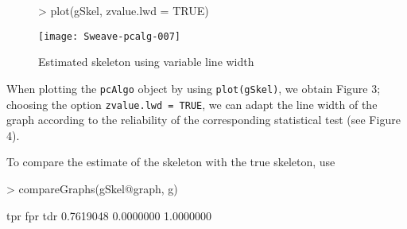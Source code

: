 \documentclass[a4paper]{article}
\begin{document}
\begin{figure}[htbp]
  \centering
\begin{Schunk}
\begin{Sinput}
> plot(gSkel, zvalue.lwd = TRUE)
\end{Sinput}
\end{Schunk}
\texttt{[image: Sweave-pcalg-007]}
\label{fig:skelLWD}
\caption{Estimated skeleton using variable line width}
\end{figure}
When plotting the \texttt{pcAlgo} object by using \texttt{plot(gSkel)}, we
obtain Figure 3; choosing the option \texttt{zvalue.lwd = TRUE}, we can
adapt the line width of the graph according to the reliability of the
corresponding statistical test (see Figure 4).

To compare the estimate of the skeleton with the true skeleton, use
\begin{Schunk}
\begin{Sinput}
> compareGraphs(gSkel@graph, g)
\end{Sinput}
\begin{Soutput}
      tpr       fpr       tdr 
0.7619048 0.0000000 1.0000000 
\end{Soutput}
\end{Schunk}
\end{document}
